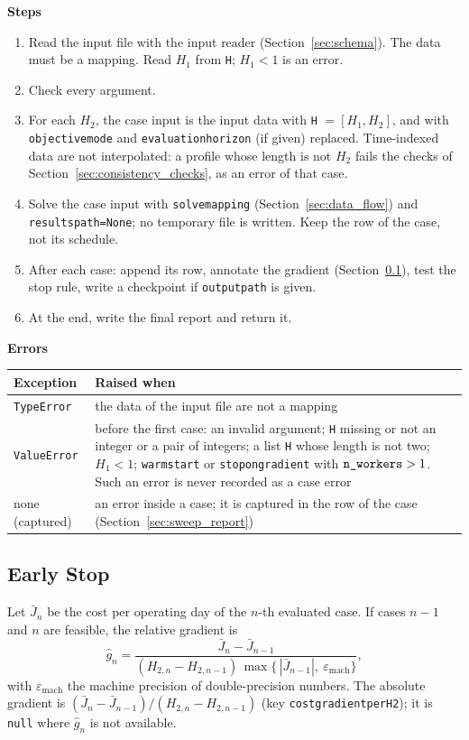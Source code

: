 \documentclass[11pt,a4paper]{article}
\makeatletter
\theoremstyle{plain}
\theoremstyle{definition}
\newcommand{\blockhead}[1]{\par\noindent\textbf{#1}\par\nobreak}
\renewcommand{\_}{\textunderscore\allowbreak{}}
\providecommand{\rejrow}[2]{{\raggedright #1\par} & {\raggedright #2\par} \\}
\providecommand{\tabstart}[2]{\begingroup\small\begin{longtable}{@{}#1@{}}\toprule #2 \\ \midrule \endhead}
\providecommand{\tabend}{\bottomrule\end{longtable}\endgroup}
\makeatother
\begin{document}
\blockhead{Steps}
\begin{enumerate}[nosep,label=\arabic*.]
  \item Read the input file with the input reader (Section~\ref{sec:schema}). The data must be a mapping. Read $H_1$ from \texttt{H}; $H_1 < 1$ is an error.
  \item Check every argument.
  \item For each $H_2$, the case input is the input data with \texttt{H} $= [H_1, H_2]$, and with \texttt{objective\_mode} and \texttt{evaluation\_horizon} (if given) replaced. Time-indexed data are not interpolated: a profile whose length is not $H_2$ fails the checks of Section~\ref{sec:consistency_checks}, as an error of that case.
  \item Solve the case input with \texttt{solve\_mapping} (Section~\ref{sec:data_flow}) and \texttt{results\_path=None}; no temporary file is written. Keep the row of the case, not its schedule.
  \item After each case: append its row, annotate the gradient (Section~\ref{sec:sweep_stop}), test the stop rule, write a checkpoint if \texttt{output\_path} is given.
  \item At the end, write the final report and return it.
\end{enumerate}

\blockhead{Errors}
\tabstart{p{3.4cm}p{11.6cm}}{Exception & Raised when}
\rejrow{\texttt{TypeError}}{the data of the input file are not a mapping}
\rejrow{\texttt{ValueError}}{before the first case: an invalid argument; \texttt{H} missing or not an integer or a pair of integers; a list \texttt{H} whose length is not two; $H_1 < 1$; \texttt{warm\_start} or \texttt{stop\_on\_gradient} with $\texttt{n\_workers} > 1$. Such an error is never recorded as a case error}
\rejrow{none (captured)}{an error inside a case; it is captured in the row of the case (Section~\ref{sec:sweep_report})}
\tabend

\subsection{Early Stop}
\label{sec:sweep_stop}

Let $\bar J_n$ be the cost per operating day of the $n$-th evaluated case. If cases $n-1$ and $n$ are feasible, the relative gradient is
\begin{equation}
  \hat g_n = \frac{\bar J_n - \bar J_{n-1}}{(H_{2,n} - H_{2,n-1})\,\max\{\,|\bar J_{n-1}|,\ \varepsilon_{\mathrm{mach}}\}},
  \label{eq:d_gradient}
\end{equation}
with $\varepsilon_{\mathrm{mach}}$ the machine precision of double-precision numbers. The absolute gradient is $(\bar J_n - \bar J_{n-1})/(H_{2,n} - H_{2,n-1})$ (key \texttt{cost\_gradient\_per\_H2}); it is \texttt{null} where $\hat g_n$ is not available.
\end{document}
